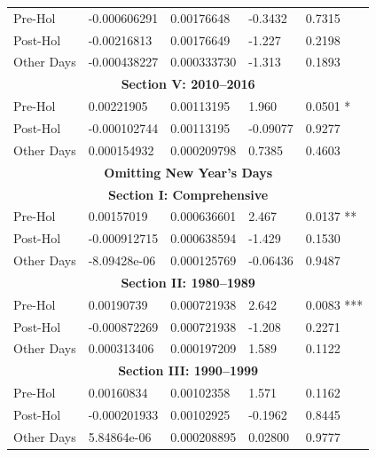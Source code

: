 \documentclass[11pt, english]{article}
\begin{document}
\begin{center}
\begin{longtable}{p{2cm}p{2cm}p{2cm}p{2cm}p{2cm}}
                \hline                                          
                Pre-Hol & -0.000606291 & 0.00176648 & -0.3432 & 0.7315\\
                Post-Hol & -0.00216813 & 0.00176649 & -1.227 & 0.2198\\  
                Other Days & -0.000438227 & 0.000333730 & -1.313 & 0.1893\\
                \hline 
                \multicolumn{5}{c}{\textbf{Section V: 2010--2016}}\\   
                \hline            
                Pre-Hol & 0.00221905 & 0.00113195 & 1.960 & 0.0501 *\\ 
                Post-Hol & -0.000102744 & 0.00113195 & -0.09077 & 0.9277\\  
                Other Days & 0.000154932 & 0.000209798 & 0.7385 & 0.4603\\
                \hline 
                \hline                                          
                \multicolumn{5}{c}{\textbf{Omitting New Year's Days}}\\ 
                \hline
                \hline
                \multicolumn{5}{c}{\textbf{Section I: Comprehensive}}\\
                \hline
                Pre-Hol & 0.00157019 & 0.000636601 & 2.467 & 0.0137 **\\
                Post-Hol & -0.000912715 & 0.000638594 & -1.429 & 0.1530\\
                Other Days & -8.09428e-06 & 0.000125769 & -0.06436 & 0.9487\\
                \hline
                \multicolumn{5}{c}{\textbf{Section II: 1980--1989}}\\
                \hline
                Pre-Hol & 0.00190739 & 0.000721938 & 2.642 & 0.0083 ***\\
                Post-Hol & -0.000872269 & 0.000721938 & -1.208 & 0.2271\\  
                Other Days & 0.000313406 & 0.000197209 & 1.589 & 0.1122\\
                \hline 
                \multicolumn{5}{c}{\textbf{Section III: 1990--1999}}\\   
                \hline            
                Pre-Hol & 0.00160834 & 0.00102358 & 1.571 & 0.1162\\ 
                Post-Hol & -0.000201933 & 0.00102925 & -0.1962 & 0.8445\\  
                Other Days & 5.84864e-06 & 0.000208895 & 0.02800 & 0.9777\\

\end{longtable}
\end{center}
\end{document}
